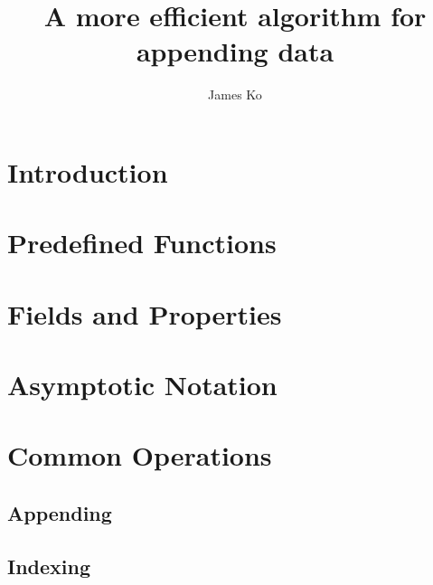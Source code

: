 \documentclass{article}
\title{A more efficient algorithm for appending data}
\author{James Ko}
\begin{document}
	\begin{titlepage}
		\maketitle
	\end{titlepage}
	
	\tableofcontents
	\newpage
	
	\begin{abstract}
		
	\end{abstract}

	\section{Introduction}

	
	
	\section{Predefined Functions}
	
	
	
	\section{Fields and Properties}
	
	
	
	\section{Asymptotic Notation}
	
	
	
	\section{Common Operations}
	
	
	
	\subsection{Appending}
	
	
	
	
	
	
	
	
	
	\subsection{Indexing}
	
\end{document}
